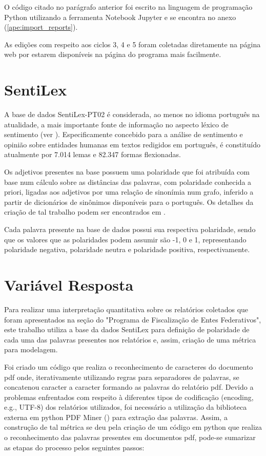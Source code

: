 O código citado no parágrafo anterior foi escrito na linguagem de programação Python utilizando a ferramenta Notebook Jupyter e se encontra no anexo (\ref{ape:import_reports}).

As edições com respeito aos ciclos 3, 4 e 5 foram coletadas diretamente na página web por estarem disponíveis na página do programa mais facilmente.

\section{SentiLex}
\label{sec:sentilex}

A base de dados SentiLex-PT02 é considerada, ao menos no idioma português na atualidade, a mais importante fonte de informação no aspecto léxico de sentimento (ver \citet{BeckerTumitan2014}). Especificamente concebido para a análise de sentimento e opinião sobre entidades humanas em textos redigidos em português, é constituído atualmente por 7.014 lemas e 82.347 formas flexionadas.

Os adjetivos presentes na base possuem uma polaridade que foi atribuída com base num cálculo sobre as distâncias das palavras, com polaridade conhecida a priori, ligadas aos adjetivos por uma relação de sinonímia num grafo, inferido a partir de dicionários de sinônimos disponíveis para o português. Os detalhes da criação de tal trabalho podem ser encontrados em \citet{Silva2012}.

Cada palavra presente na base de dados possui sua respectiva polaridade, sendo que os valores que as polaridades podem assumir são -1, 0 e 1, representando polaridade negativa, polaridade neutra e polaridade positiva, respectivamente.

\section{Variável Resposta}
\label{sec:variavel_resposta}

Para realizar uma interpretação quantitativa sobre os relatórios coletados que foram apresentados na seção do "Programa de Fiscalização de Entes Federativos", este trabalho utiliza a base da dados SentiLex para definição de polaridade de cada uma das palavras presentes nos relatórios e, assim, criação de uma métrica para modelagem.

Foi criado um código que realiza o reconhecimento de caracteres do documento pdf onde, iterativamente utilizando regras para separadores de palavras, se concatenou caracter a caracter formando as palavras do relatório pdf. Devido a problemas enfrentados com respeito à diferentes tipos de codificação (encoding, e.g., UTF-8) dos relatórios utilizados, foi necessário a utilização da biblioteca externa em python PDF Miner (\citet{PDFMiner}) para extração das palavras. Assim, a construção de tal métrica se deu pela criação de um código em python que realiza o reconhecimento das palavras presentes em documentos pdf, pode-se sumarizar as etapas do processo pelos seguintes passos:

